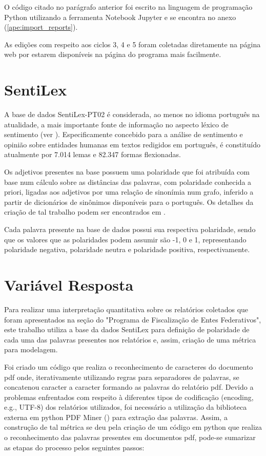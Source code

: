 O código citado no parágrafo anterior foi escrito na linguagem de programação Python utilizando a ferramenta Notebook Jupyter e se encontra no anexo (\ref{ape:import_reports}).

As edições com respeito aos ciclos 3, 4 e 5 foram coletadas diretamente na página web por estarem disponíveis na página do programa mais facilmente.

\section{SentiLex}
\label{sec:sentilex}

A base de dados SentiLex-PT02 é considerada, ao menos no idioma português na atualidade, a mais importante fonte de informação no aspecto léxico de sentimento (ver \citet{BeckerTumitan2014}). Especificamente concebido para a análise de sentimento e opinião sobre entidades humanas em textos redigidos em português, é constituído atualmente por 7.014 lemas e 82.347 formas flexionadas.

Os adjetivos presentes na base possuem uma polaridade que foi atribuída com base num cálculo sobre as distâncias das palavras, com polaridade conhecida a priori, ligadas aos adjetivos por uma relação de sinonímia num grafo, inferido a partir de dicionários de sinônimos disponíveis para o português. Os detalhes da criação de tal trabalho podem ser encontrados em \citet{Silva2012}.

Cada palavra presente na base de dados possui sua respectiva polaridade, sendo que os valores que as polaridades podem assumir são -1, 0 e 1, representando polaridade negativa, polaridade neutra e polaridade positiva, respectivamente.

\section{Variável Resposta}
\label{sec:variavel_resposta}

Para realizar uma interpretação quantitativa sobre os relatórios coletados que foram apresentados na seção do "Programa de Fiscalização de Entes Federativos", este trabalho utiliza a base da dados SentiLex para definição de polaridade de cada uma das palavras presentes nos relatórios e, assim, criação de uma métrica para modelagem.

Foi criado um código que realiza o reconhecimento de caracteres do documento pdf onde, iterativamente utilizando regras para separadores de palavras, se concatenou caracter a caracter formando as palavras do relatório pdf. Devido a problemas enfrentados com respeito à diferentes tipos de codificação (encoding, e.g., UTF-8) dos relatórios utilizados, foi necessário a utilização da biblioteca externa em python PDF Miner (\citet{PDFMiner}) para extração das palavras. Assim, a construção de tal métrica se deu pela criação de um código em python que realiza o reconhecimento das palavras presentes em documentos pdf, pode-se sumarizar as etapas do processo pelos seguintes passos:

